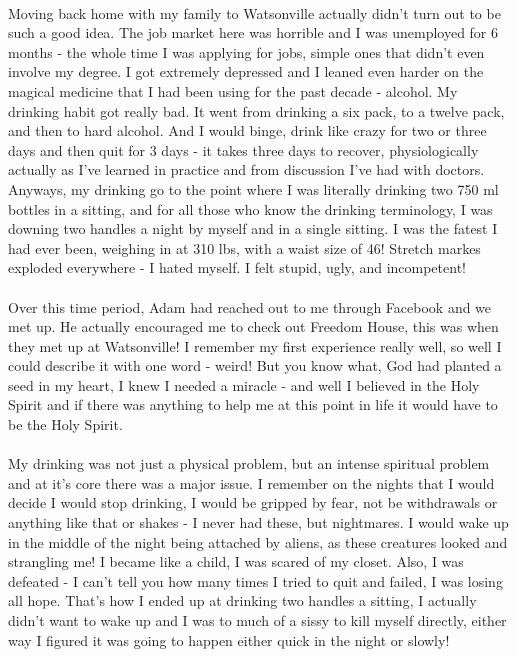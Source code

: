 \documentclass[a4paper]{article}
\begin{document}
\paragraph{}
Moving back home with my family to Watsonville actually didn't turn out to be such a good idea. The job
market here was horrible and I was unemployed for 6 months - the whole time I was applying for jobs, simple
ones that didn't even involve my degree. I got extremely depressed and I leaned even harder on the magical
medicine that I had been using for the past decade - alcohol. My drinking habit got really bad. It went from
drinking a six pack, to a twelve pack, and then to hard alcohol. And I would binge, drink like crazy for two
or three days and then quit for 3 days - it takes three days to recover, physiologically actually as I've
learned in practice and from discussion I've had with doctors. Anyways, my drinking go to the point where I
was literally drinking two 750 ml bottles in a sitting, and for all those who know the drinking terminology,
I was downing two handles a night by myself and in a single sitting. I was the fatest I had ever been,
weighing in at 310 lbs, with a waist size of 46! Stretch markes exploded everywhere - I hated myself. I felt
stupid, ugly, and incompetent!

\paragraph{}
Over this time period, Adam had reached out to me through Facebook and we met up. He actually encouraged me
to check out Freedom House, this was when they met up at Watsonville! I remember my first experience really
well, so well I could describe it with one word - weird! But you know what, God had planted a seed in my
heart, I knew I needed a miracle - and well I believed in the Holy Spirit and if there was anything to help
me at this point in life it would have to be the Holy Spirit.

\paragraph{}
My drinking was not just a physical problem, but an intense spiritual problem and at it's core there was a
major issue. I remember on the nights that I would decide I would stop drinking, I would be gripped by fear,
not be withdrawals or anything like that or shakes - I never had these, but nightmares. I would wake up in
the middle of the night being attached by aliens, as these creatures looked and strangling me! I became like
a child, I was scared of my closet. Also, I was defeated - I can't tell you how many times I tried to quit
and failed, I was losing all hope. That's how I ended up at drinking two handles a sitting, I actually
didn't want to wake up and I was to much of a sissy to kill myself directly, either way I figured it was
going to happen either quick in the night or slowly!
\end{document}
